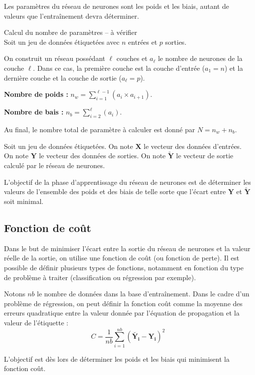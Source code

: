 \begin{defi}[Paramètres]

Les paramètres du réseau de neurones sont les poids et les biais, autant de valeurs que l’entraînement devra déterminer.

\end{defi}
\begin{methode}{Calcul du nombre de paramètres -- à vérifier} ~\\

Soit un jeu de données étiquetées avec $n$ entrées et $p$ sorties.

On construit un réseau possédant $\ell$ couches  et $a_\ell$ le nombre de neurones de la couche  $\ell$. Dans ce cas, la première couche est la couche d'entrée ($a_1 = n$) et la dernière couche et la couche de sortie ($a_\ell= p$).


\textbf{Nombre de poids :} $n_w = \sum\limits_{i=1}^{\ell-1} \left(a_i \times a_{i+1}\right)$.

\textbf{Nombre de bais :} $n_b = \sum\limits_{i=2}^{\ell}\left( a_i  \right)$.


Au final, le nombre total de paramètre à calculer est donné par $N=n_w+n_b$.

\end{methode}
\begin{obj}
Soit un jeu de données étiquetées. On note $\mathbf{X}$ le vecteur des données d'entrées. On note $\mathbf{Y}$ le vecteur des données de sorties. On note
$\mathbf{\tilde{Y}}$ le vecteur de sortie calculé par le réseau de neurones.


L'objectif de la phase d'apprentissage du réseau de neurones est de déterminer les valeurs de  l'ensemble des poids et des biais de telle sorte que l'écart entre $\mathbf{Y}$ 
et $\mathbf{\tilde{Y}}$ soit minimal.
\end{obj}




\subsection{Fonction de coût}
Dans le but de minimiser l'écart entre la sortie du réseau de neurones et la valeur réelle de la sortie, on utilise une fonction de coût (ou fonction de perte). Il est possible de définir plusieurs types de fonctions, notamment en fonction du type de problème à traiter (classification ou régression par exemple).

\begin{defi}
Notons $nb$ le nombre de données dans la base d'entraînement. Dans le cadre d'un problème de régression, on peut définir la fonction coût comme la moyenne des erreurs quadratique entre la valeur donnée par l'équation de propagation et la valeur de l'étiquette :
$$
C = \dfrac{1}{nb} \sum \limits_{i=1}^{nb} \left( \mathbf{\tilde{Y_i}} - \mathbf{Y_i}  \right)^2
$$
\end{defi}
\begin{obj}
L'objectif est dès lors de déterminer les poids et les biais qui minimisent la fonction coût.
\end{obj}



